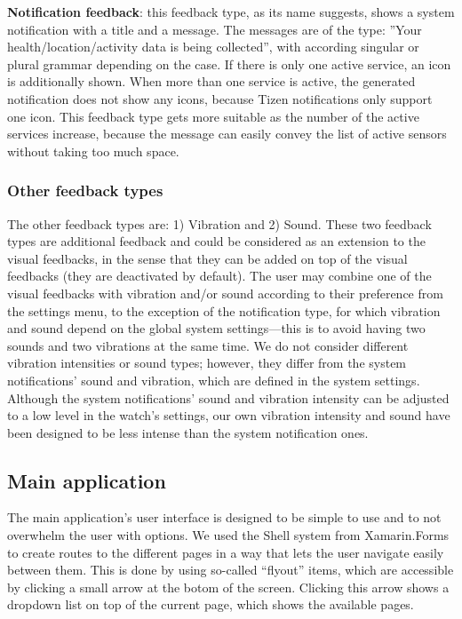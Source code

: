 \documentclass[conference, a4paper, 10pt, twocolumn]{IEEEtran}
\begin{document}
\textbf{Notification feedback}: this feedback type, as its name suggests, shows a system notification with a title and a message. The messages are of the type: ''Your health/location/activity data is being collected'', with according singular or plural grammar depending on the case. If there is only one active service, an icon is additionally shown. When more than one service is active, the generated notification does not show any icons, because Tizen notifications only support one icon. This feedback type gets more suitable as the number of the active services increase, because the message can easily convey the list of active sensors without taking too much space.

\subsubsection{\textbf{Other feedback types}}
The other feedback types are: 1) Vibration and 2) Sound. These two feedback types are additional feedback and could be considered as an extension to the visual feedbacks, in the sense that they can be added on top of the visual feedbacks (they are deactivated by default). The user may combine one of the visual feedbacks with vibration and/or sound according to their preference from the settings menu, to the exception of the notification type, for which vibration and sound depend on the global system settings---this is to avoid having two sounds and two vibrations at the same time. We do not consider different vibration intensities or sound types; however, they differ from the system notifications' sound and vibration, which are defined in the system settings. Although the system notifications' sound and vibration intensity can be adjusted to a low level in the watch's settings, our own vibration intensity and sound have been designed to be less intense than the system notification ones.

\subsection{\textbf{Main application}}
The main application's user interface is designed to be simple to use and to not overwhelm the user with options. We used the Shell system from Xamarin.Forms to create routes to the different pages in a way that lets the user navigate easily between them. This is done by using so-called ``flyout'' items, which are accessible by clicking a small arrow at the botom of the screen. Clicking this arrow shows a dropdown list on top of the current page, which shows the available pages.
\end{document}
